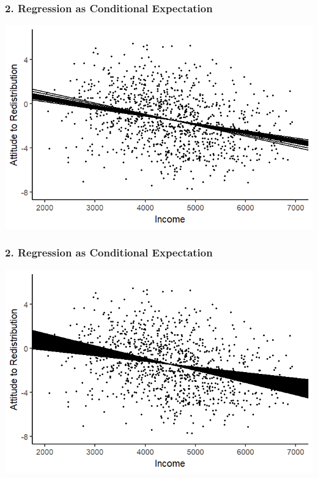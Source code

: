 \documentclass[xcolor=x11names,compress]{beamer}\usepackage[]{graphicx}\usepackage[]{color}
\makeatletter
\def\maxwidth{ %
  \ifdim\Gin@nat@width>\linewidth
    \linewidth
  \else
    \Gin@nat@width
  \fi
}
\newenvironment{knitrout}{}{} %
\renewcommand{\(}{\begin{columns}}
\renewcommand{\)}{\end{columns}}
\newcommand{\<}[1]{\begin{column}{#1}}
\renewcommand{\>}{\end{column}}
\makeatother
\begin{document}
\begin{frame}
\frametitle{2. Regression as Conditional Expectation}
\begin{knitrout}
\color{fgcolor}
\includegraphics[width=\maxwidth]{figure/cond_exp1g-1} 

\end{knitrout}
\end{frame}

\begin{frame}
\frametitle{2. Regression as Conditional Expectation}
\begin{knitrout}
\color{fgcolor}
\includegraphics[width=\maxwidth]{figure/cond_exp1g2-1} 

\end{knitrout}
\end{frame}
\end{document}
